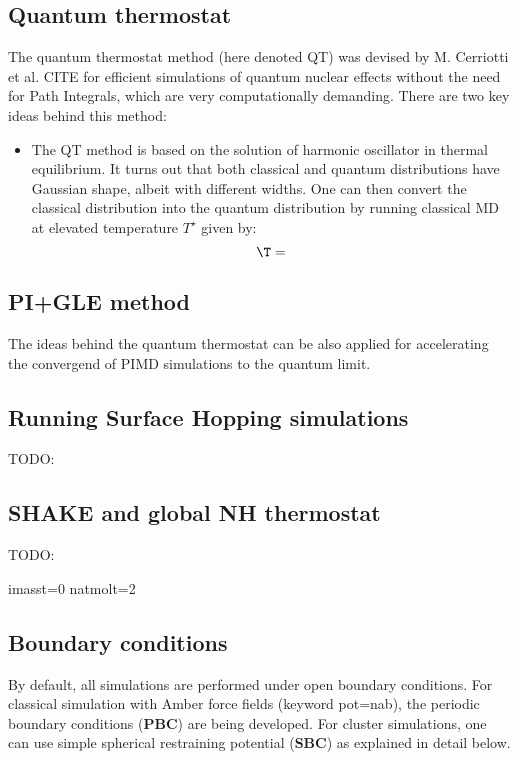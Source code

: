 \documentclass[12pt,a4paper]{article}
\begin{document}
\subsection{Quantum thermostat}
The quantum thermostat method (here denoted QT) was devised by M. Cerriotti et al. CITE for efficient simulations of quantum nuclear effects without the need for Path Integrals, which are very computationally demanding. There are two key ideas behind this method:

\begin{itemize}
\item The QT method is based on the solution of harmonic oscillator in thermal equilibrium. 
It turns out that both classical and quantum distributions have Gaussian shape, albeit with different widths. One can then convert the classical distribution into the quantum distribution
by running classical MD at elevated temperature $T^{\star}$ given by:
\begin{equation}
\T =  
\end{equation}
\end{itemize}

\subsection{PI+GLE method}
The ideas behind the quantum thermostat can be also applied for accelerating the convergend of PIMD simulations to the quantum limit.  


\subsection{Running Surface Hopping simulations}
TODO:



\subsection{SHAKE and global NH thermostat}
TODO:

\label{sec:shake}

\colorbox{black!20}{imasst=0 } %
\colorbox{black!20}{natmolt=2 } %


\subsection{Boundary conditions}
By default, all simulations are performed under open boundary conditions.
For classical simulation with Amber force fields (keyword pot=nab), the periodic boundary conditions (\textbf{PBC}) are being developed.
For cluster simulations, one can use simple spherical restraining potential (\textbf{SBC}) as explained in detail below. 
\end{document}
